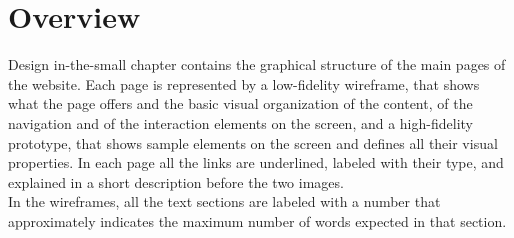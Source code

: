 \documentclass[../../DD.tex]{subfiles}
\begin{document}
\section{Overview}
	Design in-the-small chapter contains the graphical structure of the main pages of the website. Each page is represented by a low-fidelity wireframe, that shows what the page offers and the basic visual organization of the content, of the navigation and of the interaction elements on the screen, and a high-fidelity prototype, that shows sample elements on the screen and defines all their visual properties. In each page all the links are underlined, labeled with their type, and explained in a short description before the two images.\\
	In the wireframes, all the text sections are labeled with a number that approximately indicates the maximum number of words expected in that section.
\end{document}
